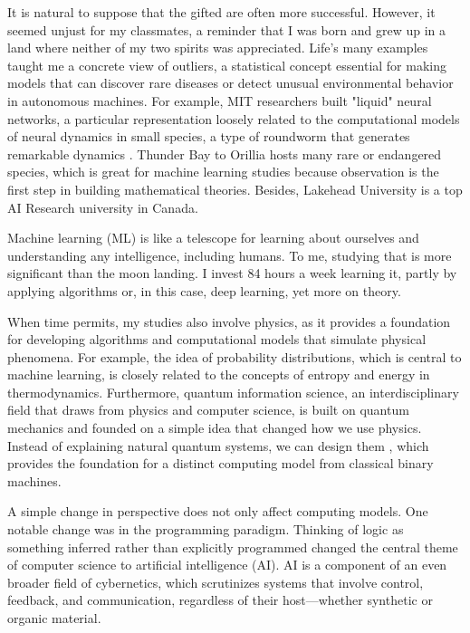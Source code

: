 \documentclass[letterpaper, 10pt]{article}
\begin{document}
\begin{multicols}{2}
	\noindent
	It is natural to suppose that the gifted are often more successful. However, it seemed unjust for my classmates, a reminder that I was born and grew up in a land where neither of my two spirits was appreciated. Life's many examples taught me a concrete view of outliers, a statistical concept essential for making models that can discover rare diseases or detect unusual environmental behavior in autonomous machines. For example, MIT researchers built  "liquid" neural networks, a particular representation loosely related to the computational models of neural dynamics in small species, a type of roundworm that generates remarkable dynamics \cite{hasani2020liquidtimeconstantnetworks}. Thunder Bay to Orillia hosts many rare or endangered species, which is great for machine learning studies because observation is the first step in building mathematical theories. Besides, Lakehead University is a top AI Research university in Canada.

	Machine learning (ML) is like a telescope for learning about ourselves and understanding any intelligence, including humans. To me, studying that is more significant than the moon landing. I invest 84 hours a week learning it, partly by applying algorithms or, in this case, deep learning, yet more on theory.

	When time permits, my studies also involve physics, as it provides a foundation for developing algorithms and computational models that simulate physical phenomena. For example, the idea of probability distributions, which is central to machine learning, is closely related to the concepts of entropy and energy in thermodynamics. Furthermore, quantum information science, an interdisciplinary field that draws from physics and computer science, is built on quantum mechanics and founded on a simple idea that changed how we use physics. Instead of explaining natural quantum systems, we can design them \cite{Nielsen_Chuang_2010}, which provides the foundation for a distinct computing model from classical binary machines.

	A simple change in perspective does not only affect computing models. One notable change was in the programming paradigm. Thinking of logic as something inferred rather than explicitly programmed \cite{Goodfellow-et-al-2016} changed the central theme of computer science to artificial intelligence (AI). AI is a component of an even broader field of cybernetics, which scrutinizes systems that involve control, feedback, and communication, regardless of their host—whether synthetic or organic material.


\end{multicols}
\end{document}
